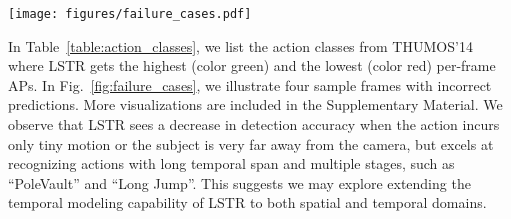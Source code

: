 \begin{figure*}[!htp]
    \vspace{-2mm}
    \begin{center}
        \texttt{[image: figures/failure\_cases.pdf]}
    \end{center}
    \vspace{-2mm}
    \caption{\textbf{Failure cases} on THUMOS'14. Action classes from left to right are ``BaseballPitch'', ``FrisbeeCatch'', ``Billiards'', and ``CricketShot''. Red circle indicates where the action is happening.}
    \label{fig:failure_cases}
    \vspace{-2mm}
\end{figure*}

In Table~\ref{table:action_classes}, we list the action classes from THUMOS'14 where LSTR gets the highest (color green) and the lowest (color red) per-frame APs. 
In Fig.~\ref{fig:failure_cases}, we illustrate four sample frames with incorrect predictions.
More visualizations are included in the Supplementary Material.
We observe that LSTR sees a decrease in detection accuracy when the action incurs only tiny motion or the subject is very far away from the camera, but excels at recognizing actions with long temporal span and multiple stages, such as ``PoleVault'' and ``Long Jump''. 
This suggests we may explore extending the temporal modeling capability of LSTR to both spatial and temporal domains.